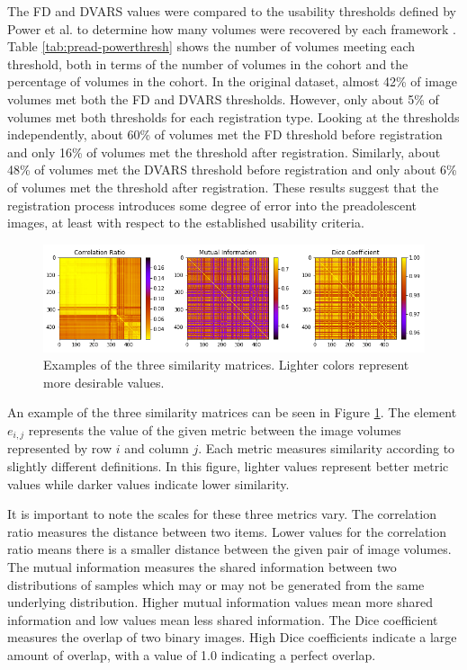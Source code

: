 The FD and DVARS values were compared to the usability thresholds defined by Power et al. to determine how many volumes were recovered by each framework \cite{Power2014}. Table \ref{tab:pread-powerthresh} shows the number of volumes meeting each threshold, both in terms of the number of volumes in the cohort and the percentage of volumes in the cohort. In the original dataset, almost 42\% of image volumes met both the FD and DVARS thresholds. However, only about 5\% of volumes met both thresholds for each registration type. Looking at the thresholds independently, about 60\% of volumes met the FD threshold before registration and only 16\% of volumes met the threshold after registration. Similarly, about 48\% of volumes met the DVARS threshold before registration and only about 6\% of volumes met the threshold after registration. These results suggest that the registration process introduces some degree of error into the preadolescent images, at least with respect to the established usability criteria.

\begin{figure}[ht]
\centering
\includegraphics[width=1\textwidth]{6/figures/similarity-mat-sample.png}
\caption{Examples of the three similarity matrices. Lighter colors represent more desirable values.}
\label{fig:sim-mat-sample}
\end{figure}

An example of the three similarity matrices can be seen in Figure \ref{fig:sim-mat-sample}. The element $e_{i,j}$ represents the value of the given metric between the image volumes represented by row $i$ and column $j$. Each metric measures similarity according to slightly different definitions. In this figure, lighter values represent better metric values while darker values indicate lower similarity.

It is important to note the scales for these three metrics vary. The correlation ratio measures the distance between two items. Lower values for the correlation ratio means there is a smaller distance between the given pair of image volumes. The mutual information measures the shared information between two distributions of samples which may or may not be generated from the same underlying distribution. Higher mutual information values mean more shared information and low values mean less shared information. The Dice coefficient measures the overlap of two binary images. High Dice coefficients indicate a large amount of overlap, with a value of 1.0 indicating a perfect overlap.

